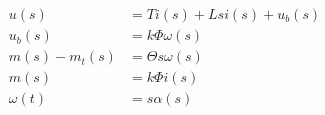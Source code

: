 \begin{align*} 
u(s) &= Ti(s) + Lsi(s) + u_b(s) \\ 
u_b(s) &= k\Phi{}\omega{}(s) \\
m(s) - m_t(s) &= \Theta{}s\omega{}(s) \\
m(s) &= k\Phi{}i(s) \\
\omega{}(t) &= s\alpha(s)
\end{align*}